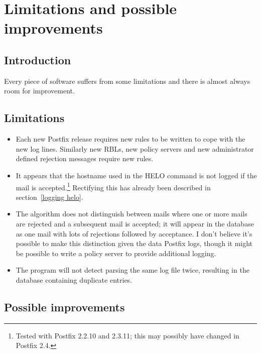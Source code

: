 \documentclass[a4paper,12pt,draft]{article}
\begin{document}
\section{Limitations and possible improvements}

\label{limitations-improvements}

\subsection{Introduction}

Every piece of software suffers from some limitations and there is almost
always room for improvement.

\subsection{Limitations}

\begin{itemize}

    \item Each new Postfix release requires new rules to be written to cope
        with the new log lines.  Similarly new RBLs, new policy servers and
        new administrator defined rejection messages require new rules.

    \item It appears that the hostname used in the HELO command is not
        logged if the mail is accepted.\footnote{Tested with Postfix 2.2.10
        and 2.3.11; this may possibly have changed in Postfix 2.4.}
        Rectifying this has already been described in section~\ref{logging
        helo}.

    \item The algorithm does not distinguish between mails where one or
        more mails are rejected and a subsequent mail is accepted; it will
        appear in the database as one mail with lots of rejections followed
        by acceptance.  I don't believe it's possible to make this
        distinction given the data Postfix logs, though it might be
        possible to write a policy server to provide additional
        logging.

    \item The program will not detect parsing the same log file twice,
        resulting in the database containing duplicate entries.

\end{itemize}

\subsection{Possible improvements}
\end{document}
